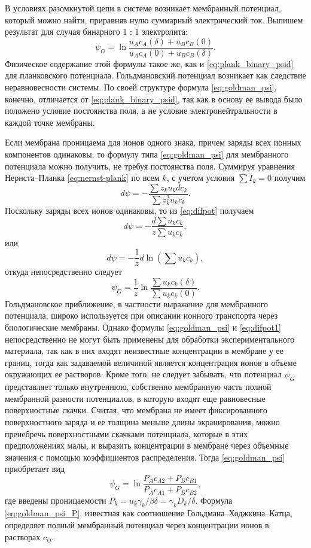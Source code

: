 В условиях разомкнутой цепи в системе возникает мембранный потенциал, который
можно найти, приравняв нулю суммарный электрический ток. Выпишем результат для
случая бинарного 1 : 1 электролита:
\begin{equation}
    \psi_G =
        \ln\frac{u_A c_A(\delta) + u_B c_B(0)}{u_A c_A(0) + u_B c_B(\delta)}.
    \label{eq:goldman_psi}
\end{equation}
Физическое содержание этой формулы такое же, как и \eqref{eq:plank_binary_psid}
для планковского потенциала. Гольдмановский потенциал возникает как следствие
неравновесности системы. По своей структуре формула \eqref{eq:goldman_psi},
конечно, отличается от \eqref{eq:plank_binary_psid}, так как в основу ее вывода
было положено условие постоянства поля, а не условие электронейтральности в
каждой точке мембраны.

Если мембрана проницаема для ионов одного знака, причем заряды всех ионных
компонентов одинаковы, то формулу типа \eqref{eq:goldman_psi} для мембранного
потенциала можно получить, не требуя постоянства поля. Суммируя уравнения
Нернста--Планка \eqref{eq:nernst-plank} по всем \( k \), с учетом условия
\( \sum I_k= 0 \) получим
\begin{equation}
    d\psi = -\frac{\sum z_k u_k dc_k}{\sum z_k^2 u_k c_k}.
    \label{eq:difpot}
\end{equation}
Поскольку заряды всех ионов одинаковы, то из \eqref{eq:difpot} получаем
\[
    d\psi = -\frac{d\sum u_k c_k}{z \sum u_k c_k},
\]
или
\[
    d\psi = -\frac{1}{z}d\ln\left(\sum u_k c_k\right),
\]
откуда непосредственно следует
\begin{equation}
    \psi_G =\frac{1}{z}\ln\frac{\sum u_k c_k(\delta)}{\sum u_k c_k(0)}.
    \label{eq:difpot1}
\end{equation}
Гольдмановское приближение, в частности выражение для мембранного потенциала,
широко используется при описании ионного транспорта через биологические
мембраны. Однако формулы \eqref{eq:goldman_psi} и \eqref{eq:difpot1} непосредственно не
могут быть применены для обработки экспериментального материала, так как в них
входят неизвестные концентрации в мембране у ее границ, тогда как задаваемой
величиной является концентрация ионов в объеме окружающих ее растворов. Кроме
того, не следует забывать, что потенциал \( \psi_G \) представляет только
внутреннюю, собственно мембранную часть полной мембранной разности потенциалов,
в которую входят еще равновесные поверхностные скачки. Считая, что мембрана не
имеет фиксированного поверхностного заряда и ее толщина меньше длины
экранирования, можно пренебречь поверхностными скачками потенциала, которые в
этих предположениях малы, и выразить концентрации в мембране через объемные
значения с помощью коэффициентов распределения. Тогда \eqref{eq:goldman_psi}
приобретает вид
\begin{equation}
    \psi_G =
    \ln\frac{P_A c_{A2} + P_B c_{B1}}{P_A c_{A1} + P_B c_{B2}},
    \label{eq:goldman_psi_P}
\end{equation}
где введены проницаемости
\( P_k = u_k\gamma_k/\beta\delta = \gamma_k D_k / \delta \). Формула
\eqref{eq:goldman_psi_P}, известная как соотношение Гольдмана--Ходжкина--Катца,
определяет полный мембранный потенциал через концентрации ионов в растворах
\( c_{ij} \).

